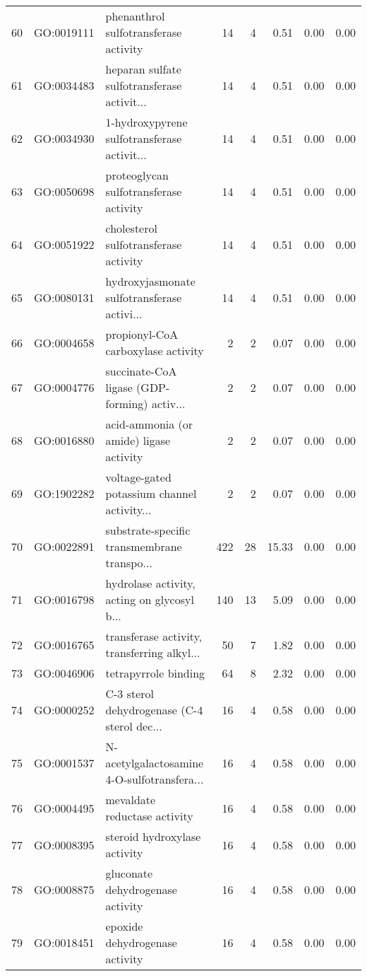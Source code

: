 \begin{table}[ht]
\begin{tabular}{rllrrrrr}
  60 & GO:0019111 & phenanthrol sulfotransferase activity &  14 &   4 & 0.51 & 0.00 & 0.00 \\ 
  61 & GO:0034483 & heparan sulfate sulfotransferase activit... &  14 &   4 & 0.51 & 0.00 & 0.00 \\ 
  62 & GO:0034930 & 1-hydroxypyrene sulfotransferase activit... &  14 &   4 & 0.51 & 0.00 & 0.00 \\ 
  63 & GO:0050698 & proteoglycan sulfotransferase activity &  14 &   4 & 0.51 & 0.00 & 0.00 \\ 
  64 & GO:0051922 & cholesterol sulfotransferase activity &  14 &   4 & 0.51 & 0.00 & 0.00 \\ 
  65 & GO:0080131 & hydroxyjasmonate sulfotransferase activi... &  14 &   4 & 0.51 & 0.00 & 0.00 \\ 
  66 & GO:0004658 & propionyl-CoA carboxylase activity &   2 &   2 & 0.07 & 0.00 & 0.00 \\ 
  67 & GO:0004776 & succinate-CoA ligase (GDP-forming) activ... &   2 &   2 & 0.07 & 0.00 & 0.00 \\ 
  68 & GO:0016880 & acid-ammonia (or amide) ligase activity &   2 &   2 & 0.07 & 0.00 & 0.00 \\ 
  69 & GO:1902282 & voltage-gated potassium channel activity... &   2 &   2 & 0.07 & 0.00 & 0.00 \\ 
  70 & GO:0022891 & substrate-specific transmembrane transpo... & 422 &  28 & 15.33 & 0.00 & 0.00 \\ 
  71 & GO:0016798 & hydrolase activity, acting on glycosyl b... & 140 &  13 & 5.09 & 0.00 & 0.00 \\ 
  72 & GO:0016765 & transferase activity, transferring alkyl... &  50 &   7 & 1.82 & 0.00 & 0.00 \\ 
  73 & GO:0046906 & tetrapyrrole binding &  64 &   8 & 2.32 & 0.00 & 0.00 \\ 
  74 & GO:0000252 & C-3 sterol dehydrogenase (C-4 sterol dec... &  16 &   4 & 0.58 & 0.00 & 0.00 \\ 
  75 & GO:0001537 & N-acetylgalactosamine 4-O-sulfotransfera... &  16 &   4 & 0.58 & 0.00 & 0.00 \\ 
  76 & GO:0004495 & mevaldate reductase activity &  16 &   4 & 0.58 & 0.00 & 0.00 \\ 
  77 & GO:0008395 & steroid hydroxylase activity &  16 &   4 & 0.58 & 0.00 & 0.00 \\ 
  78 & GO:0008875 & gluconate dehydrogenase activity &  16 &   4 & 0.58 & 0.00 & 0.00 \\ 
  79 & GO:0018451 & epoxide dehydrogenase activity &  16 &   4 & 0.58 & 0.00 & 0.00 \\ 

\end{tabular}
\end{table}
